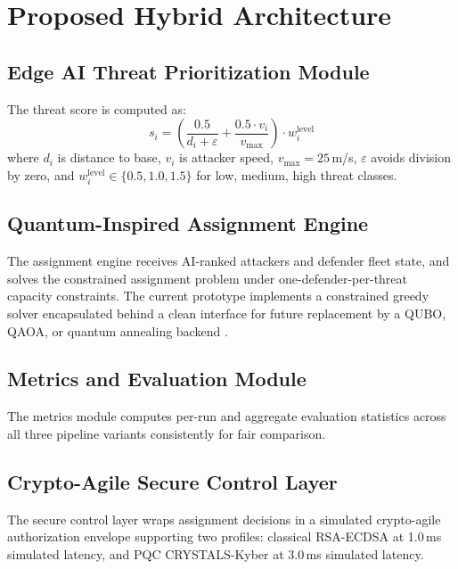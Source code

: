 \documentclass[12pt, a4paper]{article}
\begin{document}
\section{Proposed Hybrid Architecture}

\subsection{Edge AI Threat Prioritization Module}

The threat score is computed as:
\begin{equation}
  s_i = \left(\frac{0.5}{d_i + \varepsilon} + \frac{0.5 \cdot v_i}{v_{\max}}\right) \cdot w_i^{\text{level}}
\end{equation}
where $d_i$ is distance to base, $v_i$ is attacker speed, $v_{\max}=25$\,m/s, $\varepsilon$ avoids division by zero, and $w_i^{\text{level}} \in \{0.5, 1.0, 1.5\}$ for low, medium, high threat classes.

\subsection{Quantum-Inspired Assignment Engine}

The assignment engine receives AI-ranked attackers and defender fleet state, and solves the constrained assignment problem under one-defender-per-threat capacity constraints. The current prototype implements a constrained greedy solver encapsulated behind a clean interface for future replacement by a QUBO, QAOA, or quantum annealing backend \cite{glover2019quantum, farhi2014quantum}.

\subsection{Metrics and Evaluation Module}

The metrics module computes per-run and aggregate evaluation statistics across all three pipeline variants consistently for fair comparison.

\subsection{Crypto-Agile Secure Control Layer}

The secure control layer wraps assignment decisions in a simulated crypto-agile authorization envelope supporting two profiles: classical RSA-ECDSA at 1.0\,ms simulated latency, and PQC CRYSTALS-Kyber \cite{avanzi2019crystals} at 3.0\,ms simulated latency.
\end{document}
